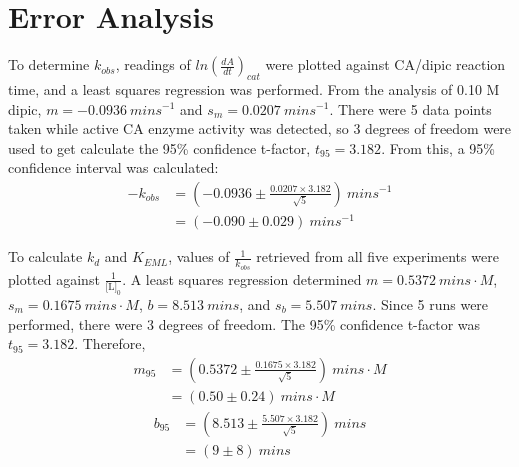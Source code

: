 \section{Error Analysis}
To determine $k_{obs}$, readings of $ln \left(\frac{dA}{dt}\right)_{cat}$ were plotted against CA/dipic reaction time, and a least squares regression was performed. From the analysis of 0.10 M dipic, $m=-0.0936{\ }{mins}^{-1}$ and $s_m=0.0207{\ }{mins}^{-1}$. There were 5 data points taken while active CA enzyme activity was detected, so 3 degrees of freedom were used to get calculate the 95\% confidence t-factor, $t_{95}=3.182$. From this, a 95\% confidence interval was calculated:
\begin{equation*}
\begin{split}
-k_{obs}&=\left (-0.0936\pm\frac{0.0207\times{3.182}}{\sqrt{5}}\right ){\ }{mins}^{-1}\\
&=\left (-0.090\pm0.029\right ){\ }{mins}^{-1}
\end{split}
\end{equation*}

To calculate $k_{d}$ and $K_{EML}$, values of $\frac{1}{k_{obs}}$ retrieved from all five experiments were plotted against $\frac{1}{\text{[L]}_0}$. A least squares regression determined $m=0.5372{\ }mins\cdot{M}$, $s_m=0.1675{\ }mins\cdot{M}$, $b=8.513{\ }{mins}$, and $s_b=5.507{\ }{mins}$. Since 5 runs were performed, there were 3 degrees of freedom. The 95\% confidence t-factor was $t_{95}=3.182$. Therefore,
\begin{equation*}
\begin{split}
m_{95}&=\left (0.5372\pm\frac{0.1675\times{3.182}}{\sqrt{5}}\right ){\ }mins\cdot{M}\\
&=\left (0.50\pm0.24\right ){\ }mins\cdot{M}
\end{split}
\end{equation*}
\begin{equation*}
\begin{split}
b_{95}&=\left (8.513\pm\frac{5.507\times{3.182}}{\sqrt{5}}\right ){\ }{mins}\\
&=\left (9\pm8\right ){\ }{mins}
 \end{split}
\end{equation*}


